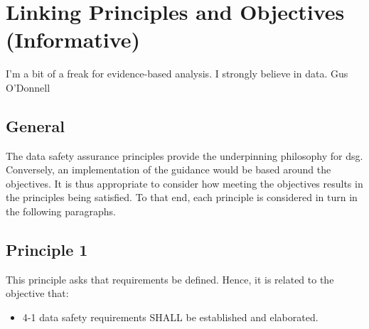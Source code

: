 %
%
\chapter{Linking Principles and Objectives (Informative)} \label{bkm:principlesobjectives}

\dsiwgSectionQuote
  {I'm a bit of a freak for evidence-based analysis. I strongly believe in data.}
  {Gus O'Donnell}


\section{General}

The data safety assurance principles provide the underpinning philosophy for \gls{dsg}. Conversely, an implementation of the guidance would be based around the objectives. It is thus appropriate to consider how meeting the objectives results in the principles being satisfied. To that end, each principle is considered in turn in the following paragraphs.


\section{Principle 1}

This principle asks that requirements be defined. Hence, it is related to the objective that:

\begin{itemize}
	\item \textcolor{dsiwgAccentColour}{4-1} \Glspl{data safety requirement} SHALL be established and elaborated.
\end{itemize}

